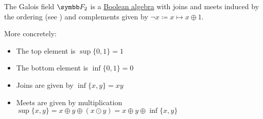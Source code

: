\begin{theorem}\label{thm:f2_is_boolean_algebra}
  The Galois field \( \BF_2 \) is a \hyperref[def:boolean_algebra]{Boolean algebra} with joins and meets induced by the ordering (see ) and complements given by \( \neg x \coloneqq x \mapsto x \oplus 1 \).

  More concretely:
  \begin{itemize}
    \item The top element is \( \sup \{ 0, 1 \} = 1 \)
    \item The bottom element is \( \inf \{ 0, 1 \} = 0 \)
    \item Joins are given by \( \inf \{ x, y \} = xy \)
    \item Meets are given by multiplication \( \sup \{ x, y \} = x \oplus y \oplus (x \odot y) = x \oplus y \oplus \inf \{ x, y \} \)
  \end{itemize}
\end{theorem}
